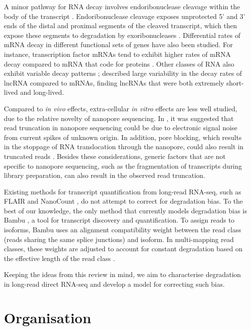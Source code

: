 A minor pathway for RNA decay involves endoribonuclease cleavage within the body of the transcript \cite{Garneau2007}. Endoribonuclease cleavage exposes unprotected 5’ and 3’ ends of the distal and proximal segments of the cleaved transcript, which then expose these segments to degradation by exoribonucleases \cite{ Gatfield2004,Garneau2007}. Differential rates of mRNA decay in different functional sets of genes have also been studied. For instance, transcription factor mRNAs tend to exhibit higher rates of mRNA decay compared to mRNA that code for proteins \cite{Yang2003}. Other classes of RNA also exhibit variable decay patterns \cite{Keene2010}; \cite{Kaiwan2021} described large variability in the decay rates of lncRNA compared to mRNAs, finding lncRNAs that were both extremely short-lived and long-lived. 

Compared to \textit{in vivo} effects, extra-cellular \textit{in vitro} effects are less well studied, due to the relative novelty of nanopore sequencing. In \cite{Workman2019}, it was suggested that read truncation in nanopore sequencing could be due to electronic signal noise from current spikes of unknown origin. In addition, pore blocking, which results in the stoppage of RNA translocation through the nanopore, could also result in truncated reads \cite{Amarasinghe2020}. Besides these considerations, generic factors that are not specific to nanopore sequencing, such as the fragmentation of transcripts during library preparation, can also result in the observed read truncation. 

Existing methods for transcript quantification from long-read RNA-seq, such as FLAIR \cite{Tang2020} and NanoCount \cite{Gleeson2021}, do not attempt to correct for degradation bias. To the best of our knowledge, the only method that currently models degradation bias is Bambu \cite{Bambu2022}, a tool for transcript discovery and quantification. To assign reads to isoforms, Bambu uses an alignment compatibility weight between the read class (reads sharing the same splice junctions) and isoform. In multi-mapping read classes, these weights are adjusted to account for constant degradation based on the effective length of the read class \cite{Bambu2022}. 

Keeping the ideas from this review in mind, we aim to characterise degradation in long-read direct RNA-seq and develop a model for correcting such bias.   

\section{Organisation}

